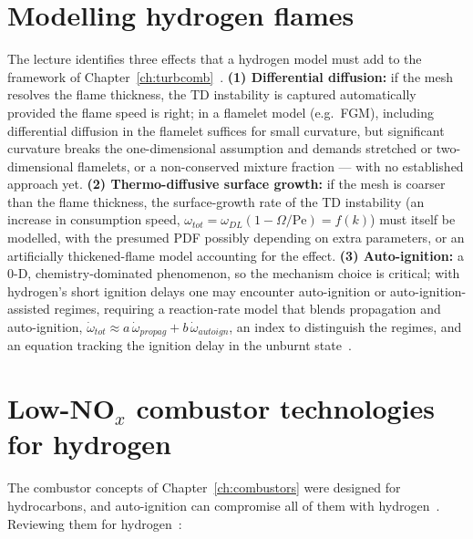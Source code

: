 \section{Modelling hydrogen flames}

The lecture identifies three effects that a hydrogen model must add to the framework of Chapter~\ref{ch:turbcomb}~\cite{lecture14}. \textbf{(1) Differential diffusion:} if the mesh resolves the flame thickness, the TD instability is captured automatically provided the flame speed is right; in a flamelet model (e.g.\ FGM), including differential diffusion in the flamelet suffices for small curvature, but significant curvature breaks the one-dimensional assumption and demands stretched or two-dimensional flamelets, or a non-conserved mixture fraction --- with no established approach yet. \textbf{(2) Thermo-diffusive surface growth:} if the mesh is coarser than the flame thickness, the surface-growth rate of the TD instability (an increase in consumption speed, $\omega_{tot}=\omega_{DL}(1-\Omega/\mathrm{Pe})=f(k)$) must itself be modelled, with the presumed PDF possibly depending on extra parameters, or an artificially thickened-flame model accounting for the effect. \textbf{(3) Auto-ignition:} a 0-D, chemistry-dominated phenomenon, so the mechanism choice is critical; with hydrogen's short ignition delays one may encounter auto-ignition or auto-ignition-assisted regimes, requiring a reaction-rate model that blends propagation and auto-ignition, $\dot\omega_{tot}\approx a\,\dot\omega_{propag}+b\,\dot\omega_{autoign}$, an index to distinguish the regimes, and an equation tracking the ignition delay in the unburnt state~\cite{lecture14}.

\section{Low-NO\texorpdfstring{$_x$}{x} combustor technologies for hydrogen}

The combustor concepts of Chapter~\ref{ch:combustors} were designed for hydrocarbons, and auto-ignition can compromise all of them with hydrogen~\cite{lecture14}. Reviewing them for hydrogen~\cite{lecture14,lecture14part1}:

